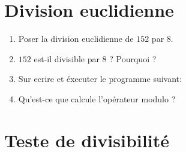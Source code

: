 \def\authors{\jules \ et \href{http://www.cellulegeometrie.eu/documents/pub/pub_14.pdf}{Académie de Reims}}
\date{2024}
\def\theme{TP : Test de divisibilité}

\def\imgPath{enseignement/4e/divisibilite-et-nombres-premiers/}
\def\imgExtension{.png}
\thispagestyle{assignment}


\vspace*{-1cm}
\vspace*{-0.75cm}

\section{Division euclidienne}
\begin{enumerate}
    \item Poser la division euclidienne de $152$ par $8$.
    \item $152$ est-il divisible par $8$ ? Pourquoi ?
    \item Sur \Scratch ecrire et éxecuter le programme suivant:
    \begin{center}\begin{scratch}
    \end{scratch}\end{center}
    \item Qu'est-ce que calcule l'opérateur modulo ?
\end{enumerate}

\vspace*{-0.25cm}
\section{Teste de divisibilité}

